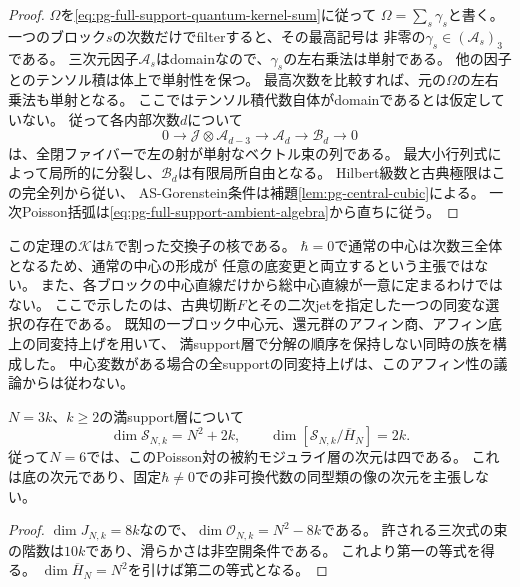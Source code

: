 \begin{proof}
$\Omega$を\eqref{eq:pg-full-support-quantum-kernel-sum}に従って
$\Omega=\sum_s\gamma_s$と書く。
一つのブロック$s$の次数だけでfilterすると、その最高記号は
非零の$\gamma_s\in(\mathcal A_s)_3$である。
三次元因子$\mathcal A_s$はdomainなので、$\gamma_s$の左右乗法は単射である。
他の因子とのテンソル積は体上で単射性を保つ。
最高次数を比較すれば、元の$\Omega$の左右乗法も単射となる。
ここではテンソル積代数自体がdomainであるとは仮定していない。
従って各内部次数$d$について
\begin{equation}
 0\longrightarrow\mathcal J\otimes\mathcal A_{d-3}
 \longrightarrow\mathcal A_d\longrightarrow\mathcal B_d
 \longrightarrow0
 \label{eq:pg-full-support-central-quotient-sequence}
\end{equation}
は、全閉ファイバーで左の射が単射なベクトル束の列である。
最大小行列式によって局所的に分裂し、$\mathcal B_d$は有限局所自由となる。
Hilbert級数と古典極限はこの完全列から従い、
AS-Gorenstein条件は補題\ref{lem:pg-central-cubic}による。
一次Poisson括弧は\eqref{eq:pg-full-support-ambient-algebra}から直ちに従う。
\end{proof}

\begin{remark}[核と選択の範囲]
\label{rem:pg-full-support-center-scope}
この定理の$\mathcal K$は$\hbar$で割った交換子の核である。
$\hbar=0$で通常の中心は次数三全体となるため、通常の中心の形成が
任意の底変更と両立するという主張ではない。
また、各ブロックの中心直線だけから総中心直線が一意に定まるわけではない。
ここで示したのは、古典切断$F$とその二次jetを指定した一つの同変な選択の存在である。
既知の一ブロック中心元、還元群のアフィン商、アフィン底上の同変持上げを用いて、
満support層で分解の順序を保持しない同時の族を構成した。
中心変数がある場合の全supportの同変持上げは、このアフィン性の議論からは従わない。
\end{remark}

\begin{corollary}[満supportの底の次元]
\label{cor:pg-full-support-moduli-dimension}
$N=3k$、$k\ge2$の満support層について
\begin{equation}
 \dim\mathcal S_{N,k}=N^2+2k,\qquad
 \dim[\mathcal S_{N,k}/\overline H_N]=2k.
 \label{eq:pg-full-support-moduli-dimension}
\end{equation}
従って$N=6$では、このPoisson対の被約モジュライ層の次元は四である。
これは底の次元であり、固定$\hbar\ne0$での非可換代数の同型類の像の次元を主張しない。
\end{corollary}
\begin{proof}
$\dim J_{N,k}=8k$なので、$\dim\mathcal O_{N,k}=N^2-8k$である。
許される三次式の束の階数は$10k$であり、滑らかさは非空開条件である。
これより第一の等式を得る。
$\dim\overline H_N=N^2$を引けば第二の等式となる。
\end{proof}

